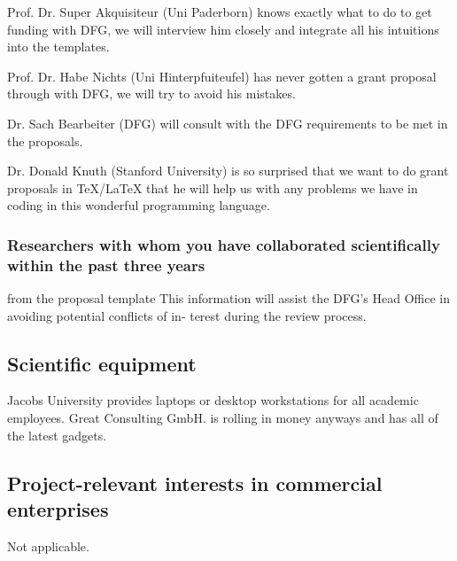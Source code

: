 \begin{compactdesc}
\item[Prof. Dr. Super Akquisiteur (Uni Paderborn)] knows exactly what to do to get funding
  with DFG, we will interview him closely and integrate all his intuitions into the {\pn}
  templates.
\item[Prof. Dr. Habe Nichts (Uni Hinterpfuiteufel)] has never gotten a grant proposal
  through with DFG, we will try to avoid his mistakes.
\item[Dr. Sach Bearbeiter (DFG)] will consult with the DFG requirements to be met in the
  proposals.
\item[Dr. Donald Knuth (Stanford University)] is so surprised that we want to do grant
  proposals in {\TeX/\LaTeX} that he will help us with any problems we have in coding in
  this wonderful programming language.
\end{compactdesc}

\subsubsection{Researchers with whom you have collaborated scientifically within the past
  three years }


\begin{todo}{from the proposal template}
  This information will assist the DFG’s Head Office in avoiding potential conflicts of
  in- terest during the review process.
\end{todo}


\subsection{Scientific equipment }

Jacobs University provides laptops or desktop workstations for all academic
employees. Great Consulting GmbH. is rolling in money anyways and has all of the latest
gadgets.


\subsection{Project-relevant interests in commercial enterprises }

Not applicable.


